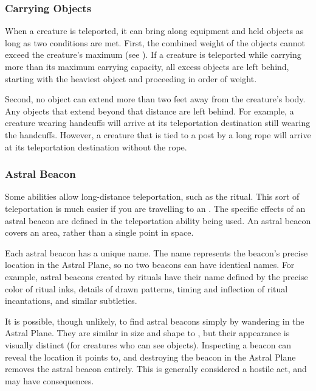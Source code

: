     \subsubsection{Carrying Objects}
      When a creature is teleported, it can bring along equipment and held objects as long as two conditions are met.
      First, the combined weight of the objects cannot exceed the creature's maximum  (see ).
      If a creature is teleported while carrying more than its maximum carrying capacity, all excess objects are left behind, starting with the heaviest object and proceeding in order of weight.

      Second, no object can extend more than two feet away from the creature's body.
      Any objects that extend beyond that distance are left behind.
      For example, a creature wearing handcuffs will arrive at its teleportation destination still wearing the handcuffs.
      However, a creature that is tied to a post by a long rope will arrive at its teleportation destination without the rope.

    \subsubsection{Astral Beacon}\label{Astral Beacon}
      Some abilities allow long-distance teleportation, such as the  ritual.
      This sort of teleportation is much easier if you are travelling to an .
      The specific effects of an astral beacon are defined in the teleportation ability being used.
      An astral beacon covers an area, rather than a single point in space.

      Each astral beacon has a unique name.
      The name represents the beacon's precise location in the Astral Plane, so no two beacons can have identical names.
      For example, astral beacons created by rituals have their name defined by the precise color of ritual inks, details of drawn patterns, timing and inflection of ritual incantations, and similar subtleties.

      It is possible, though unlikely, to find astral beacons simply by wandering in the Astral Plane.
      They are similar in size and shape to , but their appearance is visually distinct (for creatures who can see  objects).
      Inspecting a beacon can reveal the location it points to, and destroying the beacon in the Astral Plane removes the astral beacon entirely.
      This is generally considered a hostile act, and may have consequences.

